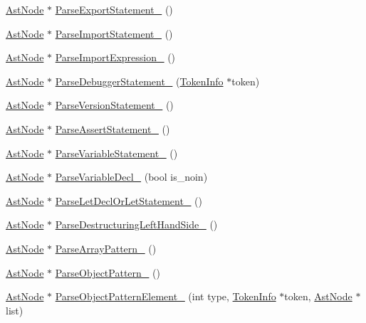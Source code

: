 \begin{DoxyCompactItemize}
\item 
\hyperlink{classmocha_1_1_ast_node}{AstNode} $\ast$ \hyperlink{classmocha_1_1_parser_ab04e91a3c4f7361b1f9078a8629e8f17}{ParseExportStatement\_\-} ()
\item 
\hyperlink{classmocha_1_1_ast_node}{AstNode} $\ast$ \hyperlink{classmocha_1_1_parser_afb93495fec483bc52c632153e663cf33}{ParseImportStatement\_\-} ()
\item 
\hyperlink{classmocha_1_1_ast_node}{AstNode} $\ast$ \hyperlink{classmocha_1_1_parser_a6fba5a6dd88e5e1ca381436b32d36de0}{ParseImportExpression\_\-} ()
\item 
\hyperlink{classmocha_1_1_ast_node}{AstNode} $\ast$ \hyperlink{classmocha_1_1_parser_ab59c04af7ace713a4f414826be77e1df}{ParseDebuggerStatement\_\-} (\hyperlink{classmocha_1_1_token_info}{TokenInfo} $\ast$token)
\item 
\hyperlink{classmocha_1_1_ast_node}{AstNode} $\ast$ \hyperlink{classmocha_1_1_parser_a7ccc1d3c6708d41c0335202607da8bc1}{ParseVersionStatement\_\-} ()
\item 
\hyperlink{classmocha_1_1_ast_node}{AstNode} $\ast$ \hyperlink{classmocha_1_1_parser_a5de65e7eddc7fbfa8e50215133240730}{ParseAssertStatement\_\-} ()
\item 
\hyperlink{classmocha_1_1_ast_node}{AstNode} $\ast$ \hyperlink{classmocha_1_1_parser_af04365a0f641787b9161ec0c6def79b7}{ParseVariableStatement\_\-} ()
\item 
\hyperlink{classmocha_1_1_ast_node}{AstNode} $\ast$ \hyperlink{classmocha_1_1_parser_a36b344198e09e468b2017b269833c094}{ParseVariableDecl\_\-} (bool is\_\-noin)
\item 
\hyperlink{classmocha_1_1_ast_node}{AstNode} $\ast$ \hyperlink{classmocha_1_1_parser_a8cef6d1862595f385aca686c51d300e0}{ParseLetDeclOrLetStatement\_\-} ()
\item 
\hyperlink{classmocha_1_1_ast_node}{AstNode} $\ast$ \hyperlink{classmocha_1_1_parser_a0295ad63dbc5fb2e470d211f697ad304}{ParseDestructuringLeftHandSide\_\-} ()
\item 
\hyperlink{classmocha_1_1_ast_node}{AstNode} $\ast$ \hyperlink{classmocha_1_1_parser_a29088d647394cadfcc696d3d190fc9c1}{ParseArrayPattern\_\-} ()
\item 
\hyperlink{classmocha_1_1_ast_node}{AstNode} $\ast$ \hyperlink{classmocha_1_1_parser_a2e6a508e8179b24fd41e01bac2217a50}{ParseObjectPattern\_\-} ()
\item 
\hyperlink{classmocha_1_1_ast_node}{AstNode} $\ast$ \hyperlink{classmocha_1_1_parser_ad6f727e5f351615c41a34dc3c01d3a20}{ParseObjectPatternElement\_\-} (int type, \hyperlink{classmocha_1_1_token_info}{TokenInfo} $\ast$token, \hyperlink{classmocha_1_1_ast_node}{AstNode} $\ast$list)

\end{DoxyCompactItemize}
